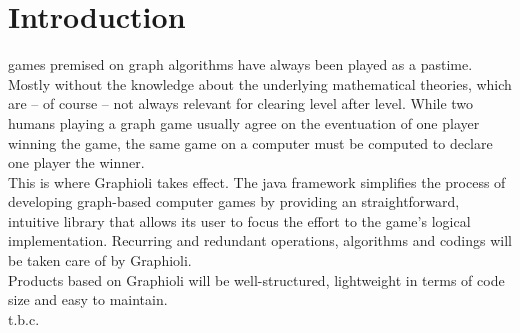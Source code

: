\section{Introduction}
\Glspl{game} premised on \gls{graph} \glspl{algorithm} have always been played as a pastime. Mostly without the knowledge about the underlying mathematical theories, which are – of course – not always relevant for clearing \gls{level} after level. While two humans playing a graph game usually agree on the eventuation of one player winning the game, the same game on a computer must be computed to declare one \gls{player} the winner.\\

This is where Graphioli takes effect. The \Gls{java} \gls{framework} simplifies the process of developing graph-based computer games by providing an straightforward, intuitive \gls{library} that allows its user to focus the effort to the game's logical implementation. Recurring and redundant operations, algorithms and codings will be taken care of by Graphioli.\\

Products based on Graphioli will be well-structured, lightweight in terms of code size and easy to maintain.\\

t.b.c.